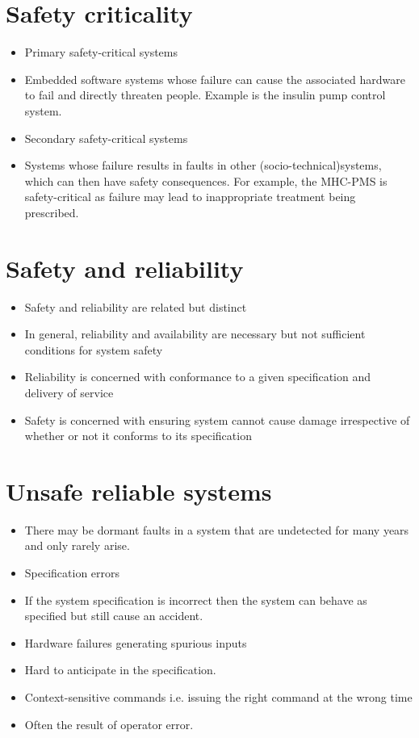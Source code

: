 \section{Safety criticality}
\begin{itemize}
\item Primary safety-critical systems

  \item Embedded software systems whose failure can cause the associated hardware to fail and directly threaten people. Example is the insulin pump control system.

\item Secondary safety-critical systems

  \item Systems whose failure results in faults in other (socio-technical)systems, which can then have safety consequences. For example, the MHC-PMS is safety-critical as failure may lead to inappropriate treatment being prescribed.

\end{itemize}
\section{Safety and reliability}
\begin{itemize}
\item Safety and reliability are related but distinct

  \item In general, reliability and availability are necessary but not sufficient conditions for system safety

\item Reliability is concerned with conformance to a given specification and delivery of service

\item Safety is concerned with ensuring system cannot cause damage irrespective of whether
or not it conforms to its specification
\end{itemize}
\section{Unsafe reliable systems}
\begin{itemize}
\item There may be dormant faults in a system that are undetected for many years and only rarely arise.

\item Specification errors

  \item If the system specification is incorrect then the system can behave as specified but still cause an accident.

\item Hardware failures generating spurious inputs   \item Hard to anticipate in the specification.
\item Context-sensitive commands i.e. issuing the right command at the wrong time

  \item Often the result of operator error.
\end{itemize}
\newpage
